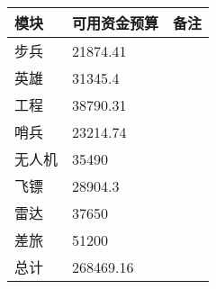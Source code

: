 \begin{longtable}{ X | X | X }

    \hline

    \endfoot
    
    \rowcolor{tabhdcolor}
    
        模块 &
        可用资金预算 &
        备注 \\
    
    \hline
    
    \endhead
    
        步兵 &
        21874.41 & 
        \\
    
    \hline
    
        英雄 &
        31345.4 & 
        \\
    
    \hline
    
        工程 &
        38790.31 & 
        \\
    
    \hline
    
        哨兵 &
        23214.74 & 
        \\
    
    \hline
    
        无人机 &
        35490 & 
        \\
    
    \hline
    
        飞镖 &
        28904.3 & 
        \\
    
    \hline
    
        雷达 &
        37650 & 
        \\

    \hline
    
        差旅 &
        51200 & 
        \\
    
    \hline
    
        总计 &
        268469.16 & 
        \\
    
    \hline
    
\end{longtable}
